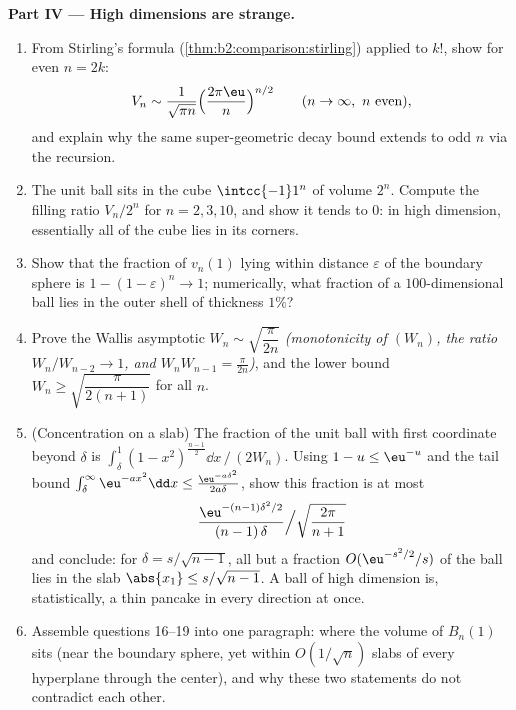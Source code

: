\begin{problem}[{Weekend problem --- $V_n =
\pi^{n/2}/\Gamma(\frac n2 + 1)$, and the strangeness of high
dimensions}]
\medskip
\noindent\textbf{Part IV --- High dimensions are strange.}
\begin{enumerate}[resume]
  \item From Stirling's formula
        (\cref{thm:b2:comparison:stirling}) applied to $k!$,
        show for even $n = 2k$:
        \[
        V_n \sim \frac{1}{\sqrt{\pi n}}
        \Bigl(\frac{2\pi\eu}{n}\Bigr)^{n/2}
        \qquad (n \to \infty, \ n \text{ even}),
        \]
        and explain why the same super-geometric decay bound
        extends to odd $n$ via the recursion.
  \item The unit ball sits in the cube $\intcc{-1}1^n$ of
        volume $2^n$. Compute the filling ratio $V_n/2^n$ for
        $n = 2, 3, 10$, and show it tends to $0$: in high
        dimension, essentially all of the cube lies in its
        corners.
  \item Show that the fraction of $v_n(1)$ lying within
        distance $\varepsilon$ of the boundary sphere is $1 -
        (1 - \varepsilon)^n \to 1$; numerically, what
        fraction of a $100$-dimensional ball lies in the
        outer shell of thickness $1\%$?
  \item Prove the Wallis asymptotic $W_n \sim
        \sqrt{\dfrac{\pi}{2n}}$ \emph{(monotonicity of
        $(W_n)$, the ratio $W_n/W_{n-2} \to 1$, and $W_nW_{n-1}
        = \frac\pi{2n}$)}, and the lower bound $W_n \geq
        \sqrt{\dfrac{\pi}{2(n+1)}}$ for all $n$.
  \item (Concentration on a slab) The fraction of the unit
        ball with first coordinate beyond $\delta$ is
        $\int_\delta^1(1 - x^2)^{\frac{n-1}2}\dd x \,\big/\,
        (2W_n)$. Using $1 - u \leq \eu^{-u}$ and the tail
        bound $\int_\delta^\infty \eu^{-a x^2}\dd x \leq
        \frac{\eu^{-a\delta^2}}{2a\delta}$, show this
        fraction is at most
        \[
        \frac{\eu^{-(n-1)\delta^2/2}}{(n-1)\,\delta}
        \Big/ \sqrt{\frac{2\pi}{n+1}}
        \]
        and conclude: for $\delta = s/\sqrt{n-1}$, all but a
        fraction $O(\eu^{-s^2/2}/s)$ of the ball lies in the
        slab $\abs{x_1} \leq s/\sqrt{n-1}$. A ball of high
        dimension is, statistically, a thin pancake in every
        direction at once.
  \item Assemble questions 16--19 into one paragraph: where
        the volume of $B_n(1)$ sits (near the boundary
        sphere, yet within $O(1/\sqrt n)$ slabs of every
        hyperplane through the center), and why these two
        statements do not contradict each other.
\end{enumerate}


\end{problem}
